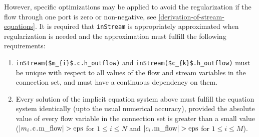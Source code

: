 However, specific optimizations may be applied to avoid the regularization if the flow through one port is zero or non-negative, see \autoref{derivation-of-stream-equations}.
It is required that \lstinline!inStream! is appropriately approximated when regularization is needed and the approximation must fulfill the following requirements:
\begin{enumerate}
\item
  \lstinline[mathescape=true]!inStream($m_{i}$.c.h_outflow)! and
  \lstinline[mathescape=true]!inStream($c_{k}$.h_outflow)! must be unique with
  respect to all values of the flow and stream variables in the
  connection set, and must have a continuous dependency on them.
\item
  Every solution of the implicit equation system above must fulfill the
  equation system identically (upto the usual numerical
  accuracy), provided the absolute value of every flow variable in
  the connection set is greater than a small value
  ($\abs{m_{i}\text{\lstinline!.c.m_flow!}} > \text{\lstinline!eps!}$ for $1 \leq i \leq N$ and
  $\abs{c_{i}\text{\lstinline!.m_flow!}} > \text{\lstinline!eps!}$ for $1 \leq i \leq M$).
\end{enumerate}


